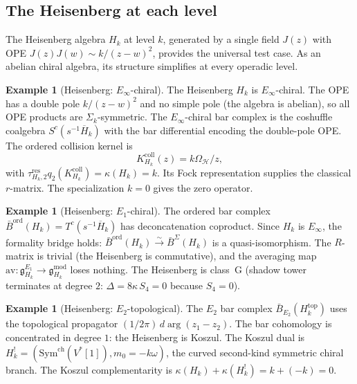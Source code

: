 \documentclass[11pt,reqno]{amsart}
\theoremstyle{definition}
\newtheorem{example}[theorem]{Example}
\theoremstyle{remark}
\providecommand{\fg}{\mathfrak{g}}
\providecommand{\Eone}{E_1}
\providecommand{\Etwo}{E_2}
\providecommand{\Einf}{E_\infty}
\providecommand{\barB}{\bar{B}}
\providecommand{\Barord}{\bar{B}^{\mathrm{ord}}}
\providecommand{\BarSig}{\bar{B}^{\Sigma}}
\providecommand{\Sym}{\mathrm{Sym}}
\begin{document}
\subsection{The Heisenberg at each level}

The Heisenberg algebra $H_k$ at level $k$, generated by a
single field $J(z)$ with OPE $J(z)J(w) \sim k/(z-w)^2$,
provides the universal test case. As an abelian chiral algebra,
its structure simplifies at every operadic level.

\begin{example}[Heisenberg: $\Einf$-chiral]
\label{ex:e-heis-einf}
The Heisenberg $H_k$ is $\Einf$-chiral. The OPE has a double
pole $k/(z-w)^2$ and no simple pole (the algebra is abelian),
so all OPE products are $\Sigma_k$-symmetric. The
$\Einf$-chiral bar complex is the coshuffle coalgebra
$S^c(s^{-1}\overline{H}_k)$ with the bar differential encoding
the double-pole OPE. The ordered collision kernel is
\begin{equation}\label{eq:e-heis-r}
K_{H_k}^{\mathrm{coll}}(z)=k\Omega_{\mathcal H}/z,
\end{equation}
with $\tau_{H_k,2}^{\mathrm{res}}q_2(K_{H_k}^{\mathrm{coll}})
=\kappa(H_k)=k$. Its Fock representation supplies the classical
$r$-matrix. The specialization $k=0$ gives the zero operator.
\end{example}

\begin{example}[Heisenberg: $\Eone$-chiral]
\label{ex:e-heis-e1}
The ordered bar complex
$\Barord(H_k) = T^c(s^{-1}\overline{H}_k)$ has deconcatenation
coproduct. Since $H_k$ is $\Einf$, the formality bridge holds:
$\Barord(H_k) \xrightarrow{\sim} \BarSig(H_k)$ is a
quasi-isomorphism. The $R$-matrix is trivial (the Heisenberg
is commutative), and the averaging map
$\mathrm{av}\colon\fg^{\Eone}_{H_k} \to \fg^{\mathrm{mod}}_{H_k}$
loses nothing. The Heisenberg is class~G (shadow tower
terminates at degree $2$: $\Delta = 8\kappa\,S_4 = 0$
because $S_4 = 0$).
\end{example}

\begin{example}[Heisenberg: $\Etwo$-topological]
\label{ex:e-heis-e2}
The $\Etwo$ bar complex
$\barB_{\Etwo}(H_k^{\mathrm{top}})$ uses the topological
propagator $(1/2\pi)\,d\arg(z_1 - z_2)$. The bar cohomology
is concentrated in degree $1$: the Heisenberg is Koszul. The
Koszul dual is
$H_k^!=(\Sym^{\mathrm{ch}}(V^*[1]),m_0=-k\omega)$, the
curved second-kind symmetric chiral branch. The Koszul
complementarity is
$\kappa(H_k) + \kappa(H_k^!) = k + (-k) = 0$.
\end{example}
\end{document}
